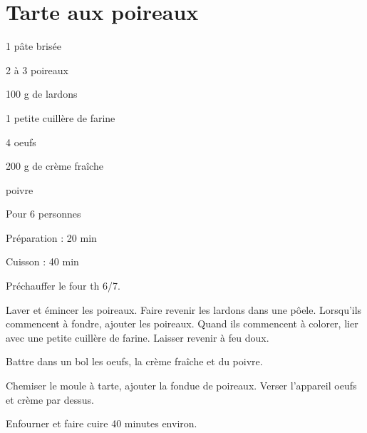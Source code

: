 \section[\normalsize{Tarte aux poireaux}]{Tarte aux poireaux}

\begin{ingredients}
\item 1 p\^ate bris\'ee
\item 2 \`a 3 poireaux
\item 100 g de lardons
\item 1 petite cuill\`ere de farine
\item 4 oeufs
\item 200 g de cr\`eme fra\^iche
\item poivre 
\end{ingredients}
\begin{infos}
\item Pour 6 personnes
\item Préparation : 20 min
\item Cuisson : 40 min
\end{infos}
\begin{etapes}
\item Pr\'echauffer le four th 6/7.
\item Laver et \'emincer les poireaux. Faire revenir les lardons dans une pôele. Lorsqu'ils commencent \`a fondre, ajouter les poireaux. Quand ils commencent \`a colorer, lier avec une petite cuill\`ere de farine. Laisser revenir \`a feu doux.
\item Battre dans un bol les oeufs, la cr\`eme fra\^iche et du poivre.
\item Chemiser le moule \`a tarte, ajouter la fondue de poireaux. Verser l'appareil oeufs et cr\`eme par dessus. 
\item Enfourner et faire cuire 40 minutes environ.
\end{etapes}
\begin{conseils}
\end{conseils}